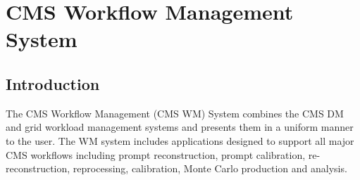 



\section{CMS Workflow Management System}
\subsection{Introduction}
The CMS Workflow Management (CMS WM) System combines the CMS DM and grid workload management systems and presents them in a uniform manner to the user. The WM system includes applications designed to support all major CMS workflows including prompt reconstruction, prompt calibration, re-reconstruction, reprocessing, calibration, Monte Carlo production and analysis.

